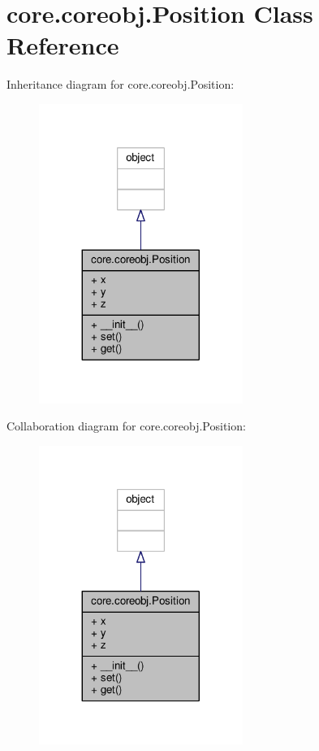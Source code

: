 \hypertarget{classcore_1_1coreobj_1_1_position}{\section{core.\+coreobj.\+Position Class Reference}
\label{classcore_1_1coreobj_1_1_position}
}


Inheritance diagram for core.\+coreobj.\+Position\+:
\nopagebreak
\begin{figure}[H]
\begin{center}
\leavevmode
\includegraphics[width=188pt]{classcore_1_1coreobj_1_1_position__inherit__graph}
\end{center}
\end{figure}


Collaboration diagram for core.\+coreobj.\+Position\+:
\nopagebreak
\begin{figure}[H]
\begin{center}
\leavevmode
\includegraphics[width=188pt]{classcore_1_1coreobj_1_1_position__coll__graph}
\end{center}
\end{figure}
